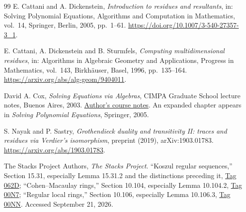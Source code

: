 \documentclass[11pt,letterpaper]{article}
\theoremstyle{definition}
\theoremstyle{remark}
\numberwithin{equation}{section}
\begin{document}
\begin{thebibliography}{99}
E. Cattani and A. Dickenstein, \emph{Introduction to residues and resultants},
in: Solving Polynomial Equations, Algorithms and Computation in Mathematics, vol.~14,
Springer, Berlin, 2005, pp.~1--61.
\url{https://doi.org/10.1007/3-540-27357-3_1}.

E. Cattani, A. Dickenstein and B. Sturmfels,
\emph{Computing multidimensional residues},
in: Algorithms in Algebraic Geometry and Applications, Progress in Mathematics, vol.~143,
Birkh\"auser, Basel, 1996, pp.~135--164.
\url{https://arxiv.org/abs/alg-geom/9404011}.

David A. Cox,
\emph{Solving Equations via Algebras},
CIMPA Graduate School lecture notes, Buenos Aires, 2003.
\href{https://mate.dm.uba.ar/~visita16/cimpa/notes/Cox.pdf}{Author's course notes}.
An expanded chapter appears in \emph{Solving Polynomial Equations}, Springer, 2005.

S. Nayak and P. Sastry,
\emph{Grothendieck duality and transitivity II: traces and residues via Verdier's isomorphism},
preprint (2019), arXiv:1903.01783.
\url{https://arxiv.org/abs/1903.01783}.

The Stacks Project Authors, \emph{The Stacks Project}.
``Koszul regular sequences,'' Section 15.31, especially Lemma 15.31.2 and the
distinctions preceding it,
\href{https://stacks.math.columbia.edu/tag/062D}{Tag 062D};
``Cohen--Macaulay rings,'' Section 10.104, especially Lemma 10.104.2,
\href{https://stacks.math.columbia.edu/tag/00N7}{Tag 00N7};
``Regular local rings,'' Section 10.106, especially Lemma 10.106.3,
\href{https://stacks.math.columbia.edu/tag/00NN}{Tag 00NN}.
Accessed September 21, 2026.

\end{thebibliography}
\endgroup
\end{document}
